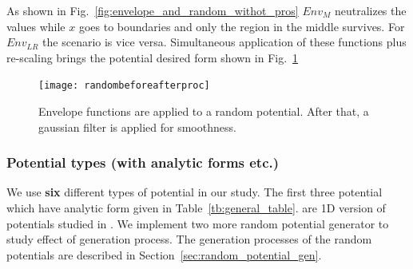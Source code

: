 \documentclass[a4paper,times,hidelinks,12pt]{article}
\begin{document}
As shown in Fig.~\ref{fig:envelope_and_random_withot_pros} $Env_{M}$ neutralizes the values while $x$ goes to boundaries and only the region in the middle survives. For $Env_{LR}$ the scenario is vice versa. Simultaneous application of these functions plus re-scaling brings the potential desired form shown in Fig.~\ref{fig:random_plus_envelope}


\graphicspath{{"../figs/potentials/"}}
\begin{figure}[H]
    \texttt{[image: randombeforeafterproc]}
\caption{Envelope functions are applied to a random potential. After that, a gaussian filter is applied for smoothness.}
\label{fig:random_plus_envelope}
\end{figure}





\subsubsection{Potential types (with analytic forms etc.)}

We use \textbf{six} different types of potential in our study. The first three potential which have analytic form given in Table~\ref{tb:general_table}. are 1D version of potentials studied in \cite{mills2017deep}. We implement two more random potential generator to study effect of generation process. The generation processes of the random potentials are described in Section~\ref{sec:random_potential_gen}.

\newcommand{\infinitewell}{$
V(x) = 
    \begin{cases}
       0 &\quad\text{if } x_l < x < x_r  \\
       \infty &\quad\text{if } \textit{otherwise} \\
    \end{cases}
$}

\newcommand{\harmonicpot}{$ V(x) =  \frac{1}{2}m \omega^2 (x - x_0) ^2 $}
\newcommand{\gaussianpot}{$V(x) = -A_1 \exp(\frac{(x - \mu_1)^2}{\sigma_1^2}) -A_2 \exp(\frac{(x - \mu_2)^2}{\sigma_2^2})$}
\newcommand{\randomexplation}{Summation of sines and cosines with random coefficients}
\newcommand{\envelopepotLR}{$\text{Env}_{LR}(x) = [(1 + \tanh{(\beta(x + x_L))}) + (1 - \tanh{(\beta(x + x_R))})]/2$}
\newcommand{\envelopepotM}{$\text{Env}_{M}(x) = 1 - \text{Env}_{LR}(x)$}
\newcommand{\randompotONE}{$V(x_{i+1}) = V(x_i) + [X\sim\mathcal{N}(\mu, \sigma)$]}
\end{document}
